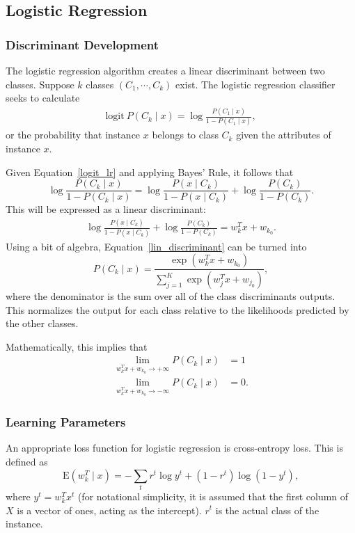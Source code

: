\documentclass{amsart}
\begin{document}
    \subsection{Logistic Regression}
    \subsubsection*{Discriminant Development}
    The logistic regression algorithm creates a linear discriminant between two classes. Suppose
    $k$ classes $(C_1, \cdots, C_k)$ exist.
    The logistic regression classifier seeks to calculate
    \begin{align}
        \textrm{logit} ~P(C_k \mid x) = \log \frac{P(C_1 \mid x)}{1 - P(C_1 \mid x)},
        \label{logit_lr}
    \end{align}
    or the probability that instance $x$ belongs to class $C_k$ given the attributes of instance
    $x$.

    Given Equation~\ref{logit_lr} and applying Bayes' Rule, it follows that
    \[
        \log \frac{P(C_k \mid x)}{1 - P(C_k \mid x)} =
        \log \frac{P(x \mid C_k)}{1 - P(x \mid C_k)} + \log \frac{P(C_k)}{1 - P(C_k)}.
    \]
    This will be expressed as a linear discriminant:
    \begin{align}
         \log \frac{P(x \mid C_k)}{1 - P(x \mid C_k)} + \log \frac{P(C_k)}{1 - P(C_k)} = w_k^T x + w_{k_0}.
        \label{lin_discriminant}
    \end{align}
    Using a bit of algebra, Equation~\ref{lin_discriminant} can be turned into \[
        P(C_k \mid x) = \frac{\exp{(w_k^T x + w_{k_0})}}{\sum_{j=1}^K \exp{(w_j^T x + w_{j_0})}},
    \]
    where the denominator is the sum over all of the class discriminants outputs. This normalizes
    the output for each class relative to the likelihoods predicted by the other classes.


    Mathematically, this implies that
    \begin{align*}
        \lim_{w_k^T x + w_{k_0} \to +\infty} P(C_k \mid x) &= 1 \\
        \lim_{w_k^T x + w_{k_0} \to -\infty} P(C_k \mid x) &= 0.
    \end{align*}

    \subsubsection*{Learning Parameters}
    An appropriate loss function for logistic regression is cross-entropy loss. This is defined
    as
    \[
        \textrm{E}(w_k^T \mid x) = -\sum_{t} r^t \log y^t + (1 - r^t)\log (1 - y^t),
    \]
    where $y^t = w_k^T x^t$ (for notational simplicity, it is assumed that the first column of $X$ is a vector of ones, acting
    as the intercept). $r^t$ is the actual class of the instance.
\end{document}
